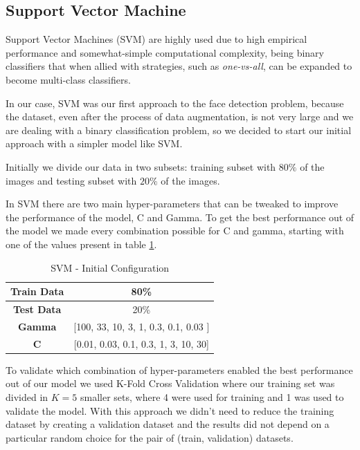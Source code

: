\subsection{Support Vector Machine} \label{svm}

Support Vector Machines (SVM) are highly used due to high empirical performance and somewhat-simple computational complexity, being binary classifiers that when allied with strategies, such as \textit{one-vs-all}, can be expanded to become multi-class classifiers.

In our case, SVM was our first approach to the face detection problem, because the dataset, even after the process of data augmentation, is not very large and we are dealing with a binary classification problem, so we decided to start our initial approach with a simpler model like SVM.

Initially we divide our data in two subsets: training subset with \(80\%\) of the images and testing subset with \(20\%\) of the images.

In SVM there are two main hyper-parameters that can be tweaked to improve the performance of the model, C and Gamma. To get the best performance out of the model we made every combination possible for C and gamma, starting with one of the values present in table \ref{table:svm-initial-configuration}.

\begin{table}[htbp]
\centering
\caption{SVM - Initial Configuration}
\begin{tabular}{ |c|c| } 
 \hline
 \textbf{Train Data} & 80\% \\ 
 \hline
 \textbf{Test Data} & 20\% \\ 
 \hline
 \textbf{Gamma} & [100, 33, 10, 3, 1, 0.3, 0.1, 0.03 ] \\ 
 \hline
 \textbf{C} & [0.01, 0.03, 0.1, 0.3, 1, 3, 10, 30] \\ 
 \hline
\end{tabular}
\label{table:svm-initial-configuration}
\end{table}

To validate which combination of hyper-parameters enabled the best performance out of our model we used K-Fold Cross Validation where our training set was divided in \(K = 5\) smaller sets, where 4 were used for training and 1 was used to validate the model. With this approach we didn't need to reduce the training dataset by creating a validation dataset and the results did not depend on a particular random choice for the pair of (train, validation) datasets.

